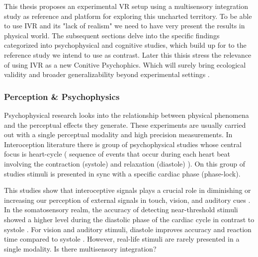 \documentclass[12pt,oneside,openright]{report}
\begin{document}
This thesis proposes an experimental VR setup using a multisensory integration study as reference and platform for exploring this uncharted territory. To be able to use IVR and its "lack of realism" we need to have very present the results in physical world. The subsequent sections delve into the specific findings categorized into psychophysical and cognitive studies, which build up for to the reference study we intend to use as contrast. Later this thisis stress the relevance of using IVR as a new Conitive Psychophics. Which will surely bring ecological validity and  broader generalizability beyond experimental settings \parencite{NASTASE2020117254}.

\subsubsection*{Perception \& Psychophysics}

Psychophysical research looks into the relationship between physical phenomena and the perceptual effects they generate. These experiments are usually carried out with a single perceptual modality and high precision measurements. In Interoception literature there is group of psychophysical studies whose central focus is heart-cycle ( sequence of events that occur during each heart beat involving the contraction (systole) and
relaxation (diastole) ). On this group of studies stimuli is presented in sync with a specific cardiac phase (phase-lock). 

This studies show that interoceptive signals plays a crucial role in diminishing or increasing our perception of external signals in touch, vision, and auditory cues \parencite{SALTAFOSSI2023108642}. In the somatosensory realm, the accuracy of detecting near-threshold stimuli showed a higher level during the diastolic phase of the cardiac cycle in contrast to systole \parencite{esra_p, AL2021118247, Grund643, motyka}. For vision and auditory stimuli, diastole improves accuracy and reaction time compared to systole \parencite{SALTAFOSSI2023108642}. However, real-life stimuli are rarely presented in a single modality. Is there multisensory integration?
\end{document}
